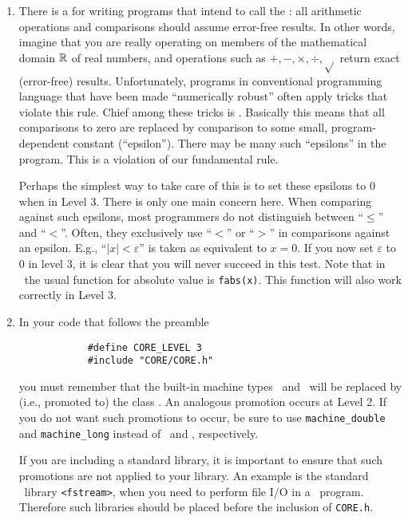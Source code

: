 \documentclass[12pt]{article}
\begin{document}
\begin{enumerate}

\item
There is a  for writing
programs that intend to call the \corelib: all arithmetic
operations and comparisons should assume error-free results.
In other words, imagine that you are really operating
on members of the mathematical domain ${\mathbb R}$ of real numbers,
and operations such as $+, -, \times, \div, \sqrt{}$ return
exact (error-free) results.
Unfortunately, programs in conventional
programming language that have been made
``numerically robust''  often apply tricks that violate this rule.
Chief among these tricks is .
Basically this means that all comparisons to zero
are replaced by comparison to some small, program-dependent
constant (``epsilon'').  There may be many such
``epsilons'' in the program.  This is a violation of our
fundamental rule.  

Perhaps the simplest way to take care
of this is to set these epsilons to $0$ when in Level 3.  
There is only one main concern here.
When comparing against such epsilons, most
programmers do not distinguish between ``$\le$'' and ``$<$''. 
Often, they exclusively use ``$<$'' or ``$>$'' in comparisons against
an epsilon.
E.g., ``$|x|< \varepsilon$'' is taken as equivalent to $x=0$.
If you now set $\varepsilon$ to $0$ in level 3, it is clear that
you will never succeed in this test.  Note that in \candcpp\ the
usual function for absolute value is \texttt{fabs(x)}.  This
function will also work correctly in Level 3. 

\item
In your code that follows the preamble

\begin{verbatim} 
        	#define CORE_LEVEL 3
        	#include "CORE/CORE.h" 
\end{verbatim} 
\noindent
you must remember that the built-in machine
types \double\ and \lng\ will be replaced by (i.e., promoted to)
the class \expr.  An analogous promotion
occurs at Level 2.  If you do not want such promotions to
occur, be sure to use {\tt machine\_double} and {\tt machine\_long}
instead of \double\ and \lng, respectively.

If you are including a standard library, it is important to ensure
that such promotions are not applied to your library.
An example is the standard \cpp\ library \texttt{<fstream>},
when you need to perform file I/O in a \core\ program.
Therefore such libraries should be placed before the
inclusion of \texttt{CORE.h}.


\end{enumerate}
\end{document}
